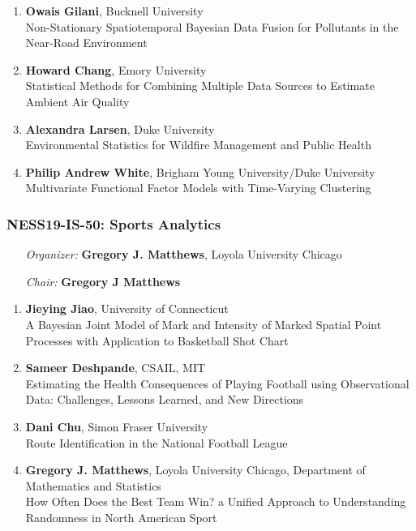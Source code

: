 \begin{enumerate}
\item \textbf{Owais Gilani}, Bucknell University \\
Non-Stationary Spatiotemporal Bayesian Data Fusion for Pollutants in the Near-Road Environment
\item \textbf{Howard Chang}, Emory University \\
Statistical Methods for Combining Multiple Data Sources to Estimate Ambient Air Quality
\item \textbf{Alexandra Larsen}, Duke University \\
Environmental Statistics for Wildfire Management and Public Health
\item \textbf{Philip Andrew White}, Brigham Young University/Duke University \\
Multivariate Functional Factor Models with Time-Varying Clustering
\end{enumerate}

\subsubsection*{NESS19-IS-50: Sports Analytics}

\begin{enumerate}[align=left]
\item [\emph{Organizer:}] \textbf{Gregory J. Matthews}, Loyola University Chicago \\
\item [\emph{Chair:}] \textbf{Gregory J Matthews}
\end{enumerate}

\begin{enumerate}
\item \textbf{Jieying Jiao}, University of Connecticut \\
A Bayesian Joint Model of Mark and Intensity of Marked   Spatial Point Processes with Application to Basketball Shot Chart
\item \textbf{Sameer Deshpande}, CSAIL, MIT \\
Estimating the Health Consequences of Playing Football using Observational Data: Challenges, Lessons Learned, and New Directions
\item \textbf{Dani Chu}, Simon Fraser University \\
Route Identification in the National Football League
\item \textbf{Gregory J. Matthews}, Loyola University Chicago, Department of Mathematics and Statistics \\
How Often Does the Best Team Win? a Unified Approach to Understanding Randomness in North American Sport
\end{enumerate}

